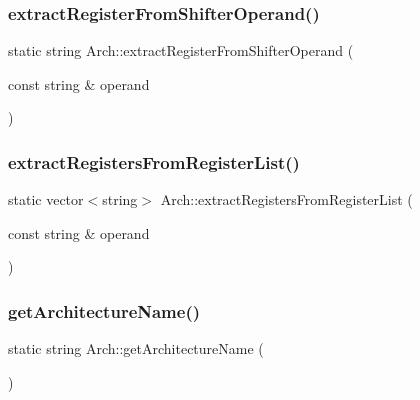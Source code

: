\mbox{\label{classArch_acbf901aa17d51e8b925888bf866f92b7}} 
\subsubsection{\texorpdfstring{extract\+Register\+From\+Shifter\+Operand()}{extractRegisterFromShifterOperand()}}
{\footnotesize\ttfamily static string Arch\+::extract\+Register\+From\+Shifter\+Operand (\begin{DoxyParamCaption}\item[{const string \&}]{operand }\end{DoxyParamCaption})\hspace{0.3cm}{\ttfamily [static]}}

\mbox{\label{classArch_acb3c4868277968fb7ca1b5841bfc33a5}} 
\subsubsection{\texorpdfstring{extract\+Registers\+From\+Register\+List()}{extractRegistersFromRegisterList()}}
{\footnotesize\ttfamily static vector$<$string$>$ Arch\+::extract\+Registers\+From\+Register\+List (\begin{DoxyParamCaption}\item[{const string \&}]{operand }\end{DoxyParamCaption})\hspace{0.3cm}{\ttfamily [static]}}

\mbox{\label{classArch_a55683507cebf0818b780a01b537b3338}} 
\subsubsection{\texorpdfstring{get\+Architecture\+Name()}{getArchitectureName()}}
{\footnotesize\ttfamily static string Arch\+::get\+Architecture\+Name (\begin{DoxyParamCaption}{ }\end{DoxyParamCaption})\hspace{0.3cm}{\ttfamily [static]}}

